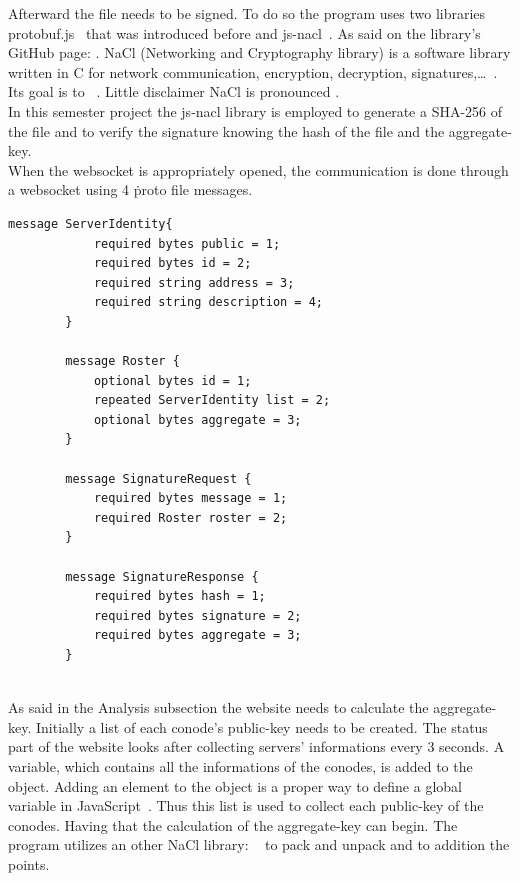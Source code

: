 \documentclass[11pt, a4paper, twoside, openright]{book} %
\begin{document}
Afterward the file needs to be signed. To do so the program uses two libraries
protobuf.js~\cite{protobufjs} that was introduced before and js-nacl~\cite{jsnacl}.
As said on the library's GitHub page: .
NaCl (Networking and Cryptography library) is a software library written in C for
network communication, encryption, decryption, signatures,\ldots~\cite{nacl}. Its
goal is to ~\cite{nacl}.
Little disclaimer NaCl is pronounced .\\
In this semester project the js-nacl library is employed to generate a SHA-256 of the file and
to verify the signature knowing the hash of the file and the aggregate-key.\\

When the websocket is appropriately opened, the communication is done through a websocket
using 4 \.proto file messages.

\begin{lstlisting}[caption={.proto file}, captionpos=b]
  message ServerIdentity{
            required bytes public = 1;
            required bytes id = 2;
            required string address = 3;
            required string description = 4;
        }

        message Roster {
            optional bytes id = 1;
            repeated ServerIdentity list = 2;
            optional bytes aggregate = 3;
        }

        message SignatureRequest {
            required bytes message = 1;
            required Roster roster = 2;
        }

        message SignatureResponse {
            required bytes hash = 1;
            required bytes signature = 2;
            required bytes aggregate = 3;
        }
\end{lstlisting}
\leavevmode \\

As said in the Analysis subsection the website needs to calculate the aggregate-key.
Initially a list of each conode's public-key needs to be created. The status part
of the website looks after collecting servers' informations every 3 seconds. A variable,
which contains all the informations of the conodes, is added to the  object.
Adding an element to the  object is a proper way to define a global variable
in JavaScript~\cite{globalVariable}. Thus this list is used to collect each public-key
of the conodes. Having that the calculation of the aggregate-key can begin.
The program utilizes an other NaCl library: ~\cite{tweetNacl} to
pack and unpack %
and to addition the points.\\
\end{document}
